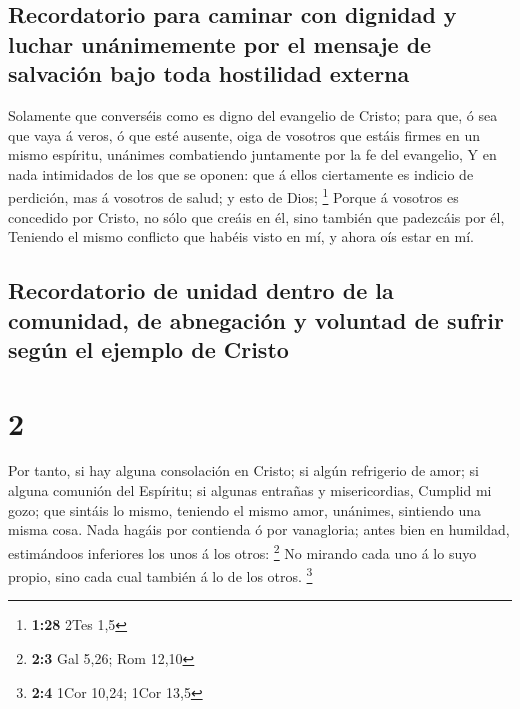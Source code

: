 \hypertarget{recordatorio-para-caminar-con-dignidad-y-luchar-unuxe1nimemente-por-el-mensaje-de-salvaciuxf3n-bajo-toda-hostilidad-externa}{%
\subsection{Recordatorio para caminar con dignidad y luchar unánimemente
por el mensaje de salvación bajo toda hostilidad
externa}\label{recordatorio-para-caminar-con-dignidad-y-luchar-unuxe1nimemente-por-el-mensaje-de-salvaciuxf3n-bajo-toda-hostilidad-externa}}

 Solamente que converséis como es digno del evangelio de
Cristo; para que, ó sea que vaya á veros, ó que esté ausente, oiga de
vosotros que estáis firmes en un mismo espíritu, unánimes combatiendo
juntamente por la fe del evangelio,  Y en nada intimidados
de los que se oponen: que á ellos ciertamente es indicio de perdición,
mas á vosotros de salud; y esto de Dios; \footnote{\textbf{1:28} 2Tes
  1,5}  Porque á vosotros es concedido por Cristo, no sólo
que creáis en él, sino también que padezcáis por él, 
Teniendo el mismo conflicto que habéis visto en mí, y ahora oís estar en
mí.

\hypertarget{recordatorio-de-unidad-dentro-de-la-comunidad-de-abnegaciuxf3n-y-voluntad-de-sufrir-seguxfan-el-ejemplo-de-cristo}{%
\subsection{Recordatorio de unidad dentro de la comunidad, de abnegación
y voluntad de sufrir según el ejemplo de
Cristo}\label{recordatorio-de-unidad-dentro-de-la-comunidad-de-abnegaciuxf3n-y-voluntad-de-sufrir-seguxfan-el-ejemplo-de-cristo}}

\hypertarget{section-1}{%
\section{2}\label{section-1}}

 Por tanto, si hay alguna consolación en Cristo; si algún
refrigerio de amor; si alguna comunión del Espíritu; si algunas entrañas
y misericordias,  Cumplid mi gozo; que sintáis lo mismo,
teniendo el mismo amor, unánimes, sintiendo una misma cosa. 
Nada hagáis por contienda ó por vanagloria; antes bien en humildad,
estimándoos inferiores los unos á los otros: \footnote{\textbf{2:3} Gal
  5,26; Rom 12,10}  No mirando cada uno á lo suyo propio,
sino cada cual también á lo de los otros. \footnote{\textbf{2:4} 1Cor
  10,24; 1Cor 13,5}

